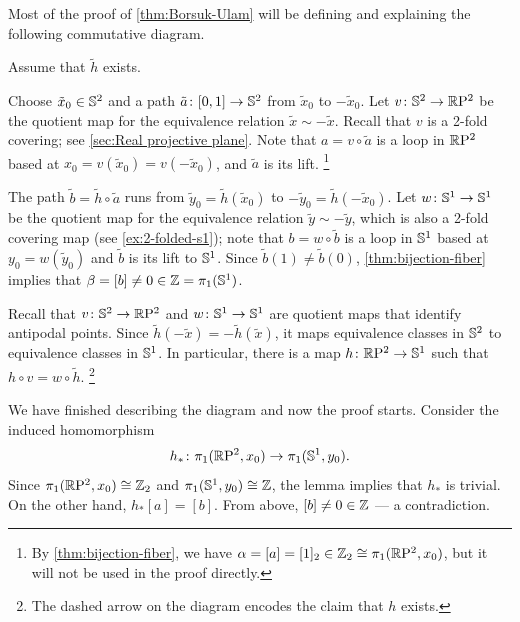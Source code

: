 {Most of the proof of \ref{thm:Borsuk-Ulam} will be defining and explaining the following commutative diagram.

\begin{figure}[h!]
\vskip-3mm
\centering
{}
\end{figure}

Assume that $\tilde h$ exists.

Choose $\tilde x_0\in \mathbb{S}^2$ and a path $\tilde a\colon[0,1]\to \mathbb{S}^2$ from $\tilde x_0$ to $-\tilde x_0$.
Let $v\colon \mathbb{S}^2\to\mathbb{R}\mathrm{P}^2$ be the quotient map for the equivalence relation $\tilde x\sim -\tilde x$.
Recall that $v$ is a 2-fold covering; see \ref{sec:Real projective plane}.
Note that $a=v\circ \tilde a$ is a loop in $\mathbb{R}\mathrm{P}^2$ based at $x_0=v(\tilde x_0)=v(-\tilde x_0)$, and $\tilde a$ is its lift.%
\footnote{By \ref{thm:bijection-fiber}, we have $\alpha=[a]=[1]_2\in \mathbb{Z}_2\cong \pi_1(\mathbb{R}\mathrm{P}^2,x_0)$, but it will not be used in the proof directly.}

The path $\tilde b=\tilde h\circ \tilde a$ runs from $\tilde y_0=\tilde h(\tilde x_0)$ to $-\tilde y_0=\tilde h(-\tilde x_0)$.
Let $w\colon \mathbb{S}^1\to\mathbb{S}^1$ be the quotient map for the equivalence relation $\tilde y\sim -\tilde y$, which is also a 2-fold covering map (see \ref{ex:2-folded-s1});
note that $b=w\circ \tilde b$ is a loop in $\mathbb{S}^1$ based at $y_0=w(\tilde y_0)$ and $\tilde b$ is its lift to $\mathbb{S}^1$.
Since $\tilde b(1)\ne \tilde b(0)$, \ref{thm:bijection-fiber} implies that $\beta=[b]\ne 0\in \mathbb{Z}=\pi_1(\mathbb{S}^1)$.

Recall that $v\colon \mathbb{S}^2\to\mathbb{R}\mathrm{P}^2$ and $w\colon \mathbb{S}^1\to\mathbb{S}^1$ are quotient maps that identify antipodal points.
Since $\tilde h(-\tilde x)=-\tilde h(\tilde x)$, it maps equivalence classes in $\mathbb{S}^2$ to equivalence classes in $\mathbb{S}^1$.
In particular, there is a map $h\colon\mathbb{R}\mathrm{P}^2\to\mathbb{S}^1$ such that $h\circ v=w\circ \tilde h$.%
\footnote{The dashed arrow on the diagram encodes the claim that $h$ exists.}

We have finished describing the diagram and now the proof starts.
Consider the induced homomorphism
\[h_*\colon\pi_1(\mathbb{R}\mathrm{P}^2,x_0)\to \pi_1(\mathbb{S}^1,y_0).\]
Since $\pi_1(\mathbb{R}\mathrm{P}^2,x_0)\cong \mathbb{Z}_2$ and $\pi_1(\mathbb{S}^1,y_0)\cong \mathbb{Z}$, the lemma implies that $h_*$ is trivial.
On the other hand, $h_*[a]=[b]$.
From above, $[b]\ne 0\in\mathbb{Z}$ --- a contradiction.
\qeds

}
